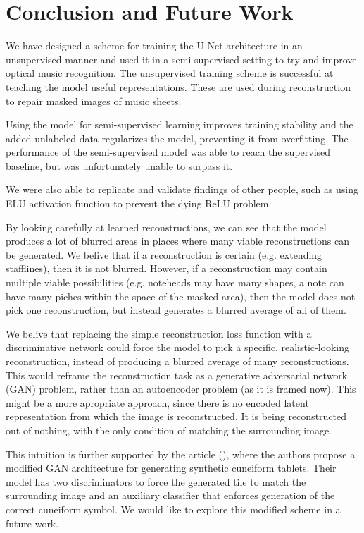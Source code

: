 \chapter{Conclusion and Future Work}
\label{chap:ConclusionAndFutureWork}

We have designed a scheme for training the U-Net architecture in an unsupervised manner and used it in a semi-supervised setting to try and improve optical music recognition. The unsupervised training scheme is successful at teaching the model useful representations. These are used during reconstruction to repair masked images of music sheets.

Using the model for semi-supervised learning improves training stability and the added unlabeled data regularizes the model, preventing it from overfitting. The performance of the semi-supervised model was able to reach the supervised baseline, but was unfortunately unable to surpass it.

We were also able to replicate and validate findings of other people, such as using ELU activation function to prevent the dying ReLU problem.

By looking carefully at learned reconstructions, we can see that the model produces a lot of blurred areas in places where many viable reconstructions can be generated. We belive that if a reconstruction is certain (e.g. extending stafflines), then it is not blurred. However, if a reconstruction may contain multiple viable possibilities (e.g. noteheads may have many shapes, a note can have many piches within the space of the masked area), then the model does not pick one reconstruction, but instead generates a blurred average of all of them.

We belive that replacing the simple reconstruction loss function with a discriminative network could force the model to pick a specific, realistic-looking reconstruction, instead of producing a blurred average of many reconstructions. This would reframe the reconstruction task as a generative adversarial network (GAN) problem, rather than an autoencoder problem (as it is framed now). This might be a more apropriate approach, since there is no encoded latent representation from which the image is reconstructed. It is being reconstructed out of nothing, with the only condition of matching the surrounding image.

This intuition is further supported by the article (\cite{Cuneiforms}), where the authors propose a modified GAN architecture for generating synthetic cuneiform tablets. Their model has two discriminators to force the generated tile to match the surrounding image and an auxiliary classifier that enforces generation of the correct cuneiform symbol. We would like to explore this modified scheme in a future work.

